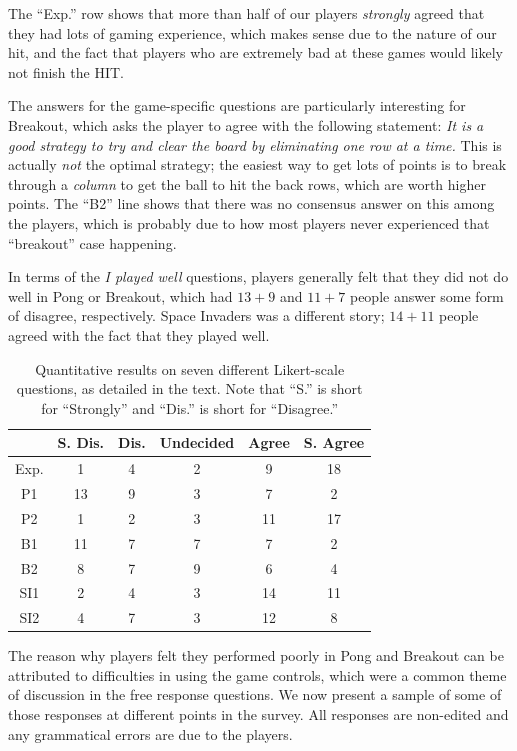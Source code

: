 \documentclass[letterpaper, 10 pt, conference]{ieeeconf}  %
\begin{document}
The ``Exp.'' row shows that more than half of our players \emph{strongly} agreed that they had lots
of gaming experience, which makes sense due to the nature of our hit, and the fact that players who
are extremely bad at these games would likely not finish the HIT.

The answers for the game-specific questions are particularly interesting for Breakout, which asks
the player to agree with the following statement: \emph{It is a good strategy to try and clear the
board by eliminating one row at a time.} This is actually \emph{not} the optimal strategy; the
easiest way to get lots of points is to break through a \emph{column} to get the ball to hit the
back rows, which are worth higher points. The ``B2'' line shows that there was no consensus answer
on this among the players, which is probably due to how most players never experienced that
``breakout'' case happening.

In terms of the \emph{I played well} questions, players generally felt that they did not do well in
Pong or Breakout, which had $13+9$ and $11+7$ people answer some form of disagree, respectively.
Space Invaders was a different story; $14+11$ people agreed with the fact that they played well.

\begin{table}[t]
\centering
\begin{tabular}{|c||c|c|c|c|c|}
\hline
  & S. Dis. & Dis. & Undecided & Agree & S. Agree \\
\hline
Exp. & 1  & 4 & 2 & 9 & 18  \\
\hline
P1 & 13 & 9 & 3 & 7 & 2 \\
P2 & 1 & 2 & 3 & 11 & 17 \\
\hline
B1 & 11 & 7 & 7 & 7 & 2 \\
B2 & 8 &  7 & 9 & 6 & 4 \\
\hline
SI1 & 2 & 4 & 3 & 14 & 11 \\
SI2 & 4 & 7 & 3 & 12 & 8 \\
\hline
\end{tabular}
\caption{Quantitative results on seven different Likert-scale questions, as detailed in the text.
Note that ``S.'' is short for ``Strongly'' and ``Dis.'' is short for ``Disagree.''}
\label{tab:human_results}
\end{table}

The reason why players felt they performed poorly in Pong and Breakout can be attributed to
difficulties in using the game controls, which were a common theme of discussion in the free
response questions. We now present a sample of some of those responses at different points in the
survey. All responses are non-edited and any grammatical errors are due to the players.
\end{document}
